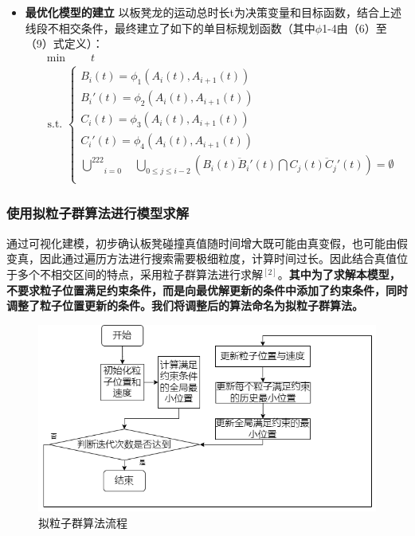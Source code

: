 \documentclass[a4paper]{article}
\begin{document}
\begin{itemize}
        \item {\textbf{最优化模型的建立}}
		以板凳龙的运动总时长t为决策变量和目标函数，结合上述线段不相交条件，最终建立了如下的单目标规划函数（其中$\phi$1-4由（6）至（9）式定义）：
		\begin{equation}
			\begin{aligned}
				& \min \quad \quad t \\
				& \text { s.t. }\left\{\begin{array}{l}
                        B_i(t) = \phi_1(A_i(t), A_{i + 1}(t))\\
                        B_{i}'(t) = \phi_2(A_i(t), A_{i + 1}(t))\\
                        C_i(t) = \phi_3(A_i(t), A_{i + 1}(t))\\
                        C_{i}'(t) = \phi_4(A_i(t), A_{i + 1}(t))\\
               \underset{i=0}{\overset{222}{\bigcup}}\quad \underset{0\leq j \leq i - 2}{\bigcup}(\overline{B_i(t)B_{i}'(t)} \bigcap \overline{C_j(t)C_{j}'(t)}) = \emptyset

  \\

				\end{array}\right.
			\end{aligned}
		\end{equation}
    \end{itemize}
	\subsubsection{使用拟粒子群算法进行模型求解}
 通过可视化建模，初步确认板凳碰撞真值随时间增大既可能由真变假，也可能由假变真，因此通过遍历方法进行搜索需要极细粒度，计算时间过长。因此结合真值位于多个不相交区间的特点，采用粒子群算法进行求解$^{[2]}$。\textbf{其中为了求解本模型，不要求粒子位置满足约束条件，而是向最优解更新的条件中添加了约束条件，同时调整了粒子位置更新的条件。我们将调整后的算法命名为拟粒子群算法。}

\begin{figure}[H]
    \centering
    \includegraphics[width=0.8\linewidth]{image/prcess_2.png}
    \caption{拟粒子群算法流程}
    \label{fig:enter-label3}
\end{figure}
\end{document}
